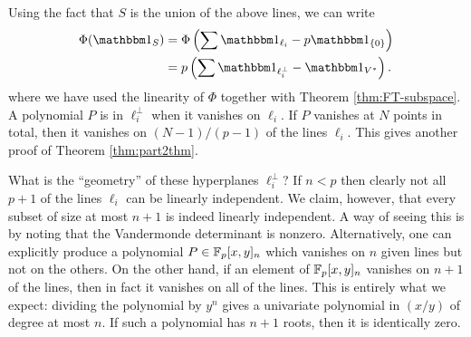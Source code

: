 Using the fact that $S$ is the union of the above lines, we can write
\begin{align*}
	\Phi(\IND_S) &= \Phi\left( \sum \IND_{\ell_i} - p\IND_{\{0\}} \right)\\
	&= p\left(\sum \IND_{\ell_i^\bot} - \IND_{V^*}\right).
\end{align*}
where we have used the linearity of $\Phi$ together with Theorem \ref{thm:FT-subspace}. A polynomial $P$ is in $\ell_i^\bot$ when it vanishes on $\ell_i$. If $P$ vanishes at $N$ points in total, then it vanishes on $(N - 1)/(p-1)$ of the lines $\ell_i$. This gives another proof of Theorem \ref{thm:part2thm}.

What is the ``geometry'' of these hyperplanes $\ell_i^\bot$? If $n < p$ then clearly not all $p+1$ of the lines $\ell_i$ can be linearly independent. We claim, however, that every subset of size at most $n+1$ is indeed linearly independent. A way of seeing this is by noting that the Vandermonde determinant is nonzero. Alternatively, one can explicitly produce a polynomial $P \in \mathbb{F}_p[x,y]_n$ which vanishes on $n$ given lines but not on the others. On the other hand, if an element of $\mathbb{F}_p[x,y]_n$ vanishes on $n+1$ of the lines, then in fact it vanishes on all of the lines. This is entirely what we expect: dividing the polynomial by $y^n$ gives a univariate polynomial in $(x/y)$ of degree at most $n$. If such a polynomial has $n+1$ roots, then it is identically zero.